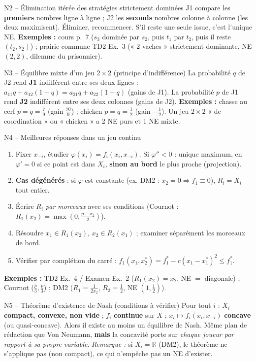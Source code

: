 \documentclass[11pt,a4paper]{article}
\begin{document}
\begin{methbox}{N2 -- Élimination itérée des stratégies strictement dominées}
J1 compare les \textbf{premiers} nombres ligne à ligne ; J2 les \textbf{seconds} nombres colonne à colonne (les deux maximisent). Éliminer, recommencer. S'il reste une seule issue, c'est l'unique NE.
\textbf{Exemples :} cours p.~7 ($s_3$ dominée par $s_2$, puis $t_1$ par $t_2$, puis il reste $(t_2,s_2)$) ; prairie commune TD2 Ex.~3 (« 2 vaches » strictement dominante, NE $(2,2)$, dilemme du prisonnier).
\end{methbox}

\begin{methbox}{N3 -- Équilibre mixte d'un jeu $2\times2$ (principe d'indifférence)}
La probabilité $q$ de J2 rend \textbf{J1} indifférent entre ses deux lignes : $a_{11}q+a_{12}(1-q)=a_{21}q+a_{22}(1-q)$ (gains de J1). La probabilité $p$ de J1 rend \textbf{J2} indifférent entre ses deux colonnes (gains de J2).
\textbf{Exemples :} chasse au cerf $p=q=\frac79$ (gain $\frac{70}9$) ; chicken $p=q=\frac12$ (gain $-\frac12$). Un jeu $2\times2$ « de coordination » ou « chicken » a 2 NE purs et 1 NE mixte.
\end{methbox}

\begin{methbox}{N4 -- Meilleures réponses dans un jeu continu}
\begin{enumerate}[leftmargin=*]
\item Fixer $x_{-i}$, étudier $\varphi(x_i)=f_i(x_i,x_{-i})$. Si $\varphi''<0$ : unique maximum, en $\varphi'=0$ si ce point est dans $X_i$, \textbf{sinon au bord} le plus proche (projection).
\item \textbf{Cas dégénérés} : si $\varphi$ est constante (ex. DM2 : $x_2=0\Rightarrow f_1\equiv0$), $R_i=X_i$ tout entier.
\item Écrire $R_i$ \emph{par morceaux} avec ses conditions (Cournot : $R_1(x_2)=\max(0,\frac{p-x_2}2)$).
\item Résoudre $x_1\in R_1(x_2)$, $x_2\in R_2(x_1)$ ; examiner séparément les morceaux de bord.
\item Vérifier par complétion du carré : $f_1(x_1,x_2^*)=f_1^*-c(x_1-x_1^*)^2\le f_1^*$.
\end{enumerate}
\textbf{Exemples :} TD2 Ex.~4 / Examen Ex.~2 ($R_1(x_2)=x_2$, NE $=$ diagonale) ; Cournot ($\frac p3,\frac p3$) ; DM2 ($R_1=\frac1{2x_2}$, $R_2=\frac12$, NE $(1,\frac12)$).
\end{methbox}

\begin{methbox}{N5 -- Théorème d'existence de Nash (conditions à vérifier)}
Pour tout $i$ : $X_i$ \textbf{compact, convexe, non vide} ; $f_i$ \textbf{continue} sur $X$ ; $x_i\mapsto f_i(x_i,x_{-i})$ \textbf{concave} (ou quasi-concave). Alors il existe au moins un équilibre de Nash. Même plan de rédaction que Von Neumann, \textbf{mais} la concavité porte sur \emph{chaque joueur par rapport à sa propre variable}. \emph{Remarque :} si $X_i=\mathbb{R}$ (DM2), le théorème ne s'applique pas (non compact), ce qui n'empêche pas un NE d'exister.
\end{methbox}
\end{document}
